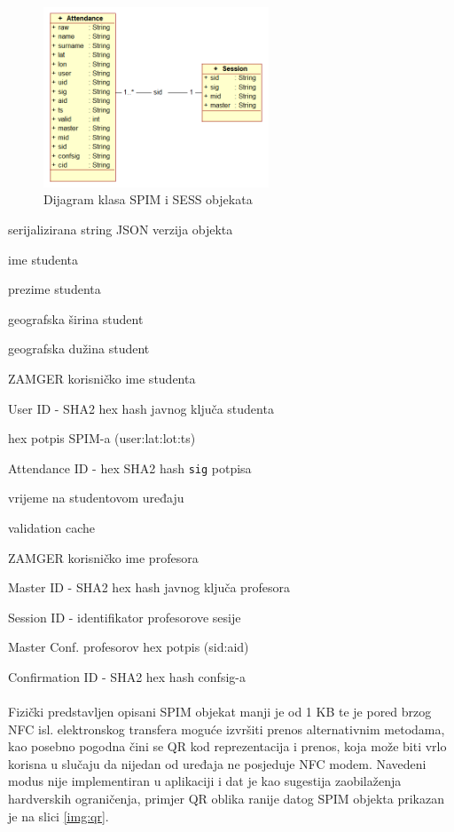 \begin{figure}[H]
    \centering
    \includegraphics[width=0.6\textwidth]{material/classmodel}
    \caption{Dijagram klasa SPIM i SESS objekata}
    \label{fig:dia_class}
\end{figure}
\begin{description}[align=right,labelwidth=2cm,noitemsep]
    \item [raw] serijalizirana string JSON verzija objekta
    \item [name] ime studenta
    \item [surname] prezime studenta
    \item [lat] geografska širina student
    \item [lon] geografska dužina student
    \item [user] ZAMGER korisničko ime studenta
    \item [uid] User ID - SHA2 hex hash javnog ključa studenta
    \item [sig] hex potpis SPIM-a (user:lat:lot:ts)
    \item [aid] Attendance ID - hex SHA2 hash \texttt{sig} potpisa
    \item [ts] vrijeme na studentovom uređaju
    \item [valid] validation cache
    \item [master] ZAMGER korisničko ime profesora
    \item [mid] Master ID - SHA2 hex hash javnog ključa profesora
    \item [sid] Session ID - identifikator profesorove sesije
    \item [confsig] Master Conf. profesorov hex potpis (sid:aid)
    \item [cid] Confirmation ID - SHA2 hex hash confsig-a
\end{description}

\paragraph*{}
Fizički predstavljen opisani SPIM objekat manji je od 1 KB te je pored brzog NFC isl. elektronskog transfera moguće izvršiti prenos alternativnim metodama, kao posebno pogodna čini se QR kod reprezentacija\cite{soon2008qr} i prenos, koja može biti vrlo korisna u slučaju da nijedan od uređaja ne posjeduje NFC modem. Navedeni modus nije implementiran u aplikaciji i dat je kao sugestija zaobilaženja hardverskih ograničenja, primjer QR oblika ranije datog SPIM objekta prikazan je na slici \ref{img:qr}.

